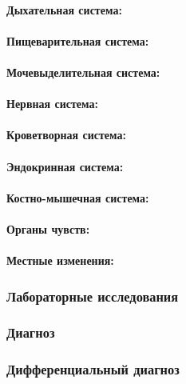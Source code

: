 \documentclass[a4paper,14pt]{extarticle}
\begin{document}
\paragraph{Дыхательная система:}

\paragraph{Пищеварительная система:}

\paragraph{Мочевыделительная система:}

\paragraph{Нервная система:} 

\paragraph{Кроветворная система:}

\paragraph{Эндокринная система:}

\paragraph{Костно-мышечная система:}

\paragraph{Органы чувств:}

\paragraph{Местные изменения:}

\subsubsection*{Лабораторные исследования}

\subsubsection*{Диагноз}

\subsubsection*{Дифференциальный диагноз}
\end{document}
